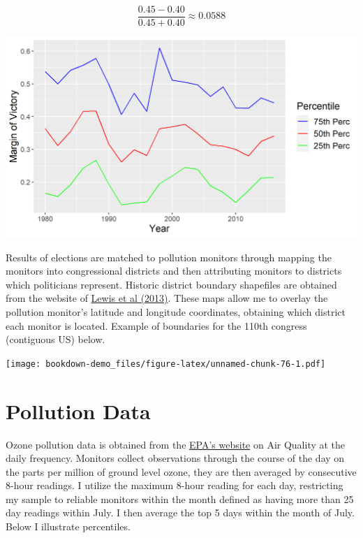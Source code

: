 \documentclass[
]{book}
\begin{document}
\[
\frac{0.45 - 0.40}{0.45 + 0.40} \approx 0.0588
\]

\begin{center}\includegraphics[width=0.8\linewidth]{img/victory_margin_prc_by_year} \end{center}

Results of elections are matched to pollution monitors through mapping the monitors into congressional districts and then attributing monitors to districts which politicians represent. Historic district boundary shapefiles are obtained from the website of \href{https://cdmaps.polisci.ucla.edu/}{Lewis et al (2013)}. These maps allow me to overlay the pollution monitor's latitude and longitude coordinates, obtaining which district each monitor is located. Example of boundaries for the 110th congress (contiguous US) below.

\texttt{[image: bookdown-demo\_files/figure-latex/unnamed-chunk-76-1.pdf]}

\hypertarget{pollution-data}{%
\section{Pollution Data}\label{pollution-data}}

Ozone pollution data is obtained from the \href{https://aqs.epa.gov/aqsweb/airdata/download_files.html\#Daily}{EPA's website} on Air Quality at the daily frequency. Monitors collect observations through the course of the day on the parts per million of ground level ozone, they are then averaged by consecutive 8-hour readings. I utilize the maximum 8-hour reading for each day, restricting my sample to reliable monitors within the month defined as having more than 25 day readings within July. I then average the top 5 days within the month of July. Below I illustrate percentiles.
\end{document}
